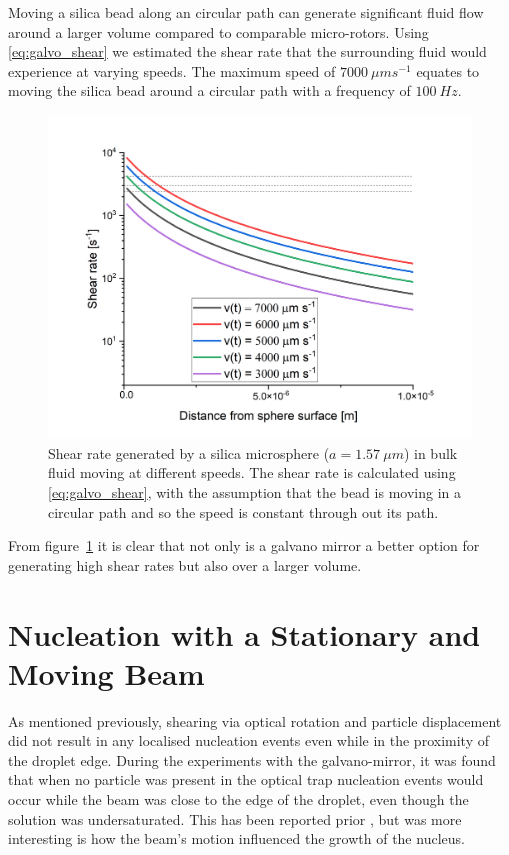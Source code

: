 Moving a silica bead along an circular path can generate significant fluid 
flow around a larger volume compared to comparable micro-rotors. Using \eqref{eq:galvo_shear} we estimated the shear rate that the surrounding fluid 
would experience at varying speeds. The maximum speed of $7000\ \mu m s^{-1}$
equates to moving the silica bead around a circular path with a frequency of 
$100\ Hz$.
\begin{figure}[h!]
	\centering
	\includegraphics[width=\linewidth]{galvano_shear_rate.png}
	\caption{Shear rate generated by a silica microsphere ($a = 1.57\ \mu m$) 
		in bulk fluid moving at different speeds. The shear rate is calculated 
		using \eqref{eq:galvo_shear}, with the assumption that the bead is moving
		in a circular path and so the speed is constant through out its path.}
	\label{fig:galvano_shear}
\end{figure}

From figure~\ref{fig:galvano_shear} it is clear that not only is a galvano 
mirror a better option for generating high shear rates but also over a larger 
volume.

\section{Nucleation with a Stationary and Moving Beam}
As mentioned previously, shearing via optical rotation and particle displacement
did not result in any localised nucleation events even while in the proximity of 
the droplet edge. During the experiments with the galvano-mirror, it was found 
that when no particle was present in the optical trap nucleation events would 
occur while the beam was close to the edge of the droplet, even though the solution
was undersaturated. This has been reported prior \cite{Rungsimanon2010, Liao2022}, 
but was more interesting is how the beam's motion influenced the growth of the nucleus.


